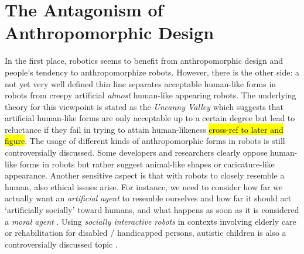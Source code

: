 \documentclass[lettersize, apacite, twoside, HRI]{apa_HRI}
\begin{document}
\section{The Antagonism of Anthropomorphic Design}
\label{sec:2}

	
	In the first place, robotics seems to benefit from anthropomorphic design and people's tendency to anthropomorphize robots. However, there is the other side: a not yet very well defined thin line separates acceptable human-like forms in robots from creepy artificial \textit{almost} human-like appearing robots. The underlying theory for this viewpoint is stated as the \textit{Uncanny Valley} \cite{mori_uncanny_1970} which suggests that artificial human-like forms are only acceptable up to a certain degree but lead to reluctance if they fail in trying to attain human-likeness \hl{cross-ref to later and figure}. The usage of different kinds of anthropomorphic forms in robots is still controversially discussed. Some developers and researchers clearly oppose human-like forms in robots but rather suggest animal-like shapes or caricature-like appearance. Another sensitive aspect is that with robots to closely resemble a human, also ethical issues arise. For instance, we need to consider how far we actually want an \textit{artificial agent} to resemble ourselves and how far it should act `artificially socially' toward humans, and what happens as soon as it is considered a \textit{moral agent} \cite{sullins_when_2006}. Using \textit{socially interactive robots} in contexts involving elderly care or rehabilitation for disabled / handicapped persons, autistic children is also a controversially discussed topic \cite{robins_robots_2005}.
	
\end{document}
